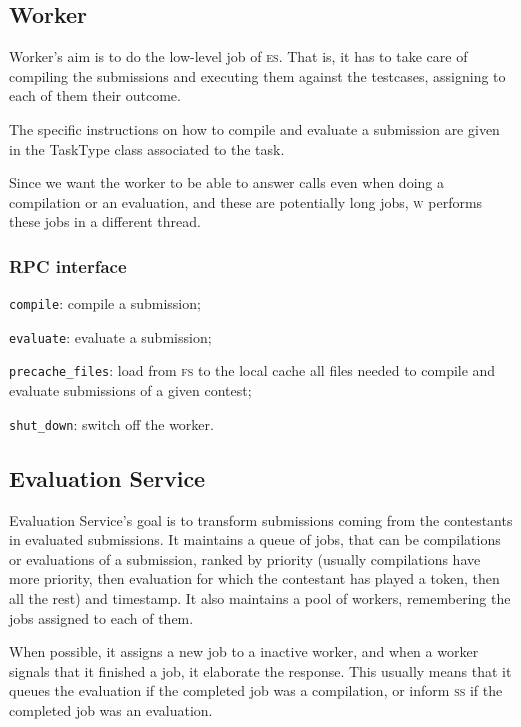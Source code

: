 \documentclass[a4paper,8pt]{amsart}
\newcommand{\FS}{\textsc{fs}}
\newcommand{\ES}{\textsc{es}}
\newcommand{\WS}{\textsc{w}}
\renewcommand{\SS}{\textsc{ss}}
\newenvironment{squishlist}{%
  \begin{list}{\textbullet}%
    { \setlength{\itemsep}{0pt}%
      \setlength{\parsep}{3pt}%
      \setlength{\topsep}{3pt}%
      \setlength{\partopsep}{0pt}%
      \setlength{\leftmargin}{1.5em}%
      \setlength{\labelwidth}{1em}%
      \setlength{\labelsep}{0.5em} }%
}{\end{list}}
\newcommand{\id}[1]{\texttt{#1}}
\begin{document}
\begin{multicols}{2}
  \subsection{Worker}

  Worker's aim is to do the low-level job of \ES{}. That is, it
  has to take care of compiling the submissions and executing them
  against the testcases, assigning to each of them their outcome.

  The specific instructions on how to compile and evaluate a
  submission are given in the TaskType class associated to the task.

  Since we want the worker to be able to answer calls even when doing
  a compilation or an evaluation, and these are potentially long jobs,
  \WS{} performs these jobs in a different thread.

  \subsubsection{RPC interface}

  \begin{squishlist}
  \item \id{compile}: compile a submission;
  \item \id{evaluate}: evaluate a submission;
  \item \id{precache\_files}: load from \FS{} to the local cache all
    files needed to compile and evaluate submissions of a given
    contest;
  \item \id{shut\_down}: switch off the worker.
  \end{squishlist}

  \subsection{Evaluation Service}

  Evaluation Service's goal is to transform submissions coming from the
  contestants in evaluated submissions. It maintains a queue of jobs,
  that can be compilations or evaluations of a submission, ranked by
  priority (usually compilations have more priority, then evaluation
  for which the contestant has played a token, then all the rest) and
  timestamp. It also maintains a pool of workers, remembering the jobs
  assigned to each of them.

  When possible, it assigns a new job to a inactive worker, and when a
  worker signals that it finished a job, it elaborate the
  response. This usually means that it queues the evaluation if the
  completed job was a compilation, or inform \SS{} if the completed
  job was an evaluation.


\end{multicols}
\end{document}
